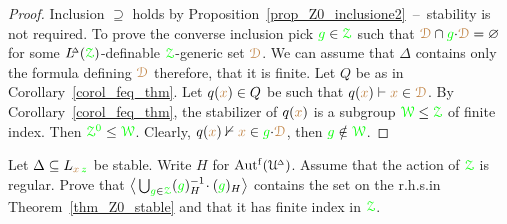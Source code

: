 \begin{proof}
  Inclusion $\supseteq$ holds by Proposition~\ref{prop_Z0_inclusione2}~--~stability is not required.
  To prove the converse inclusion pick ${\gr g}\in\grZ$ such that $\mrD\cap{\gr g}{\cdot}\mrD=\varnothing$ for some $\LDelta(\grZ)$-definable $\grZ$-generic set $\mrD$.
  We can assume that $\Delta$ contains only the formula defining $\mrD$ therefore, that it is finite.
  Let $Q$ be as in Corollary~\ref{corol_feq_thm}.
  Let $q({\mr x})\in Q$ be such that $q({\mr x})\proves{\mr x}\in\mrD$.
  By Corollary~\ref{corol_feq_thm}, the stabilizer of $q({\mr x})$ is a subgroup $\grW\le\grZ$ of finite index.
  Then ${\gr\Z^0}\le\grW$.
  Clearly, $q({\mr x})\notproves{\mr x}\in{\gr g}{\cdot}\mrD$, then ${\gr g}\notin\grW$.
\end{proof}

\begin{exercise}
  Let $\Delta\subseteq L_{{\mr x}\,{\gr z}}$ be stable.
  Write $H$ for $\Autf(\UDelta)$.
  Assume that the action of $\grZ$ is regular.
  Prove that $\big\<\bigcup_{{\gr g}\in\grZ}({\gr g})_H^{-1}\!\cdot({\gr g})_H\big\>$ contains the set on the r.h.s.\@ in Theorem~\ref{thm_Z0_stable} and that it has finite index in $\grZ$.
\end{exercise}

  
  



  


